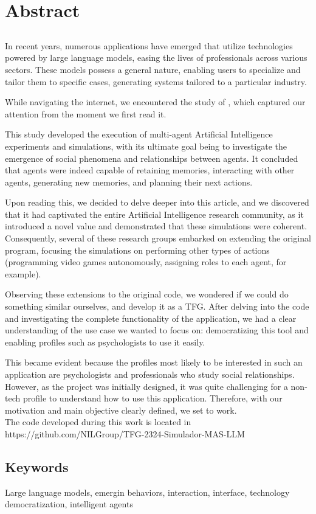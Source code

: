 \chapter*{Abstract}

\section*{\tituloPortadaEngVal}

In recent years, numerous applications have emerged that utilize technologies powered by large language models, easing the lives of professionals across various sectors. These models possess a general nature, enabling users to specialize and tailor them to specific cases, generating systems tailored to a particular industry.

While navigating the internet, we encountered the study of \ga \citep{park2023generative}, which captured our attention from the moment we first read it.

This study developed the execution of multi-agent Artificial Intelligence experiments and simulations, with its ultimate goal being to investigate the emergence of social phenomena and relationships between agents. It concluded that agents were indeed capable of retaining memories, interacting with other agents, generating new memories, and planning their next actions.

Upon reading this, we decided to delve deeper into this article, and we discovered that it had captivated the entire Artificial Intelligence research community, as it introduced a novel value and demonstrated that these simulations were coherent. Consequently, several of these research groups embarked on extending the original program, focusing the simulations on performing other types of actions (programming video games autonomously, assigning roles to each agent, for example).

Observing these extensions to the original code, we wondered if we could do something similar ourselves, and develop it as a TFG. After delving into the code and investigating the complete functionality of the application, we had a clear understanding of the use case we wanted to focus on: democratizing this tool and enabling profiles such as psychologists to use it easily.

This became evident because the profiles most likely to be interested in such an application are psychologists and professionals who study social relationships. However, as the project was initially designed, it was quite challenging for a non-tech profile to understand how to use this application. Therefore, with our motivation and main objective clearly defined, we set to work.\\[0.1em]

The code developed during this work is located in https://github.com/NILGroup/TFG-2324-Simulador-MAS-LLM


\section*{Keywords}

\noindent Large language models, emergin behaviors, interaction, interface, technology democratization, intelligent agents



